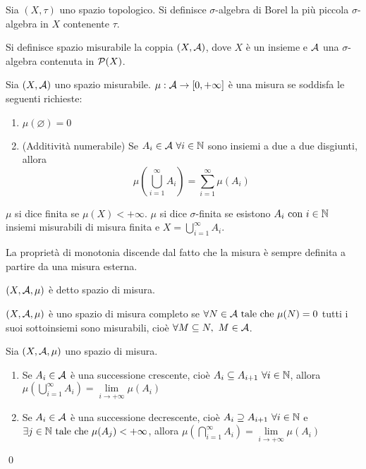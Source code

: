 \begin{definition}
	Sia $(X,\tau)$ uno spazio topologico. Si definisce $\sigma$-algebra di Borel la più piccola $\sigma$-algebra in $X$ contenente $\tau$.
\end{definition}

\begin{definition}
	Si definisce spazio misurabile la coppia $(X,\mathcal{A})$, dove $X$ è un insieme e $\mathcal{A}$ una $\sigma$-algebra contenuta in $\mathcal{P}(X)$.
\end{definition}

\begin{definition}
	[Misura]
	Sia $(X,\mathcal{A})$ uno spazio misurabile. $\mu:\mathcal{A} \to [0,+\infty]$ è una misura se soddisfa le seguenti richieste:
	\begin{enumerate}
		\item $\mu(\varnothing)=0$
		\item (Additività numerabile) Se $A_i \in \mathcal{A} \ \forall i \in \mathbb{N}$ sono insiemi a due a due disgiunti, allora $$\displaystyle\mu\left(\bigcup_{i=1}^\infty A_i \right) = \sum_{i=1}^\infty \mu(A_i)$$
	\end{enumerate}
	$\mu$ si dice finita se $\mu(X)<+\infty$. $\mu$ si dice $\sigma$-finita se esistono $A_i \text{ con } i \in \mathbb{N}$ insiemi misurabili di misura finita e $X=\bigcup\limits_{i=1}^\infty A_i$.
\end{definition}

\begin{remark}
	La proprietà di monotonia discende dal fatto che la misura è sempre definita a partire da una misura esterna.
\end{remark}

\begin{definition}
	$(X,\mathcal{A},\mu)$ è detto spazio di misura.
\end{definition}

\begin{definition}
	$(X,\mathcal{A},\mu)$ è uno spazio di misura completo se $\forall N \in \mathcal{A} \text{ tale che } \mu(N)=0$ tutti i suoi sottoinsiemi sono misurabili, cioè $\forall M\subseteq N, \ M\in \mathcal{A}$.
\end{definition}

\begin{theorem}
	Sia $(X,\mathcal{A},\mu)$ uno spazio di misura.
	\begin{enumerate}
		\item Se $A_i \in \mathcal{A}$ è una successione crescente, cioè $A_i \subseteq A_{i+1} \ \forall i \in \mathbb{N}$, allora $\mu\left(\bigcup\limits_{i=1}^\infty A_i\right) = \lim\limits_{i\to + \infty}\mu(A_i)$
		\item Se $A_i \in \mathcal{A}$ è una successione decrescente, cioè $A_i \supseteq A_{i+1} \ \forall i \in \mathbb{N}$ e $\exists j \in \mathbb{N} \text{ tale che } \mu(A_j) < + \infty$, allora $\mu\left(\bigcap\limits_{i=1}^\infty A_i\right)=\lim\limits_{i\to +\infty}\mu(A_i)$
	\end{enumerate}
	\qed
\end{theorem}

